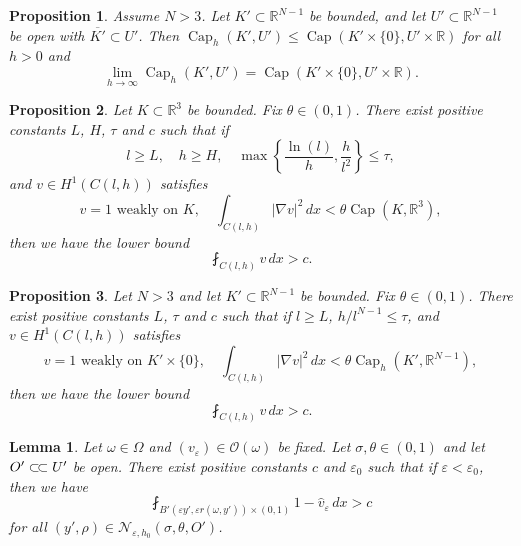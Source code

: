 \documentclass[10pt,a4paper]{amsart}
\newtheorem{proposition}{Proposition}
\newtheorem{lemma}{Lemma}
\newcommand{\cpct}{\operatorname{Cap}}
\newcommand{\csubset}{\subset\joinrel\subset}
\begin{document}
\begin{proposition} \label{pr:limit_at_infinity}
    Assume $N > 3$. Let $K' \subset \mathbb{R}^{N - 1}$ be bounded, and let $U' \subset \mathbb{R}^{N - 1}$ be open with $\overline{K'} \subset U'$. Then $\cpct_h(K', U') \le \cpct(K' \times \{0\}, U' \times \mathbb{R})$ for all $h > 0$ and
    \[
    \lim_{h \to \infty} \cpct_h(K', U') = \cpct(K' \times \{0\}, U' \times \mathbb{R}).
    \]
\end{proposition}

\begin{proposition} \label{pr:subcapacitary_growth_1}
    Let $K \subset \mathbb{R}^3$ be bounded. Fix $\theta \in (0, 1)$. There exist positive constants $L$, $H$, $\tau$ and $c$ such that if
    \[
    l \ge L, \quad h \ge H, \quad \max \left\{\frac{\ln(l)}{h}, \frac{h}{l^2} \right\} \le \tau,
    \]
    and $v \in H^1(C(l, h))$ satisfies
    \[
    v = 1 \text{ weakly on } K, \quad \int_{C(l, h)} |\nabla v|^2 \, dx < \theta \cpct(K, \mathbb{R}^3),
    \]
    then we have the lower bound
    \[
    \fint_{C(l, h)} v \, dx > c.
    \]
\end{proposition}

\begin{proposition} \label{pr:subcapacitary_growth_2}
    Let $N > 3$ and let $K' \subset \mathbb{R}^{N - 1}$ be bounded. Fix $\theta \in (0, 1)$. There exist positive constants $L$, $\tau$ and $c$ such that if $l \ge L$, $h/l^{N - 1} \le \tau$, and $v \in H^1(C(l, h))$ satisfies
    \[
    v = 1 \text{ weakly on } K' \times \{0\}, \quad \int_{C(l, h)} |\nabla v|^2 \, dx < \theta \cpct_h(K', \mathbb{R}^{N - 1}),
    \]
    then we have the lower bound
    \[
    \fint_{C(l, h)} v \, dx > c.
    \]
\end{proposition}

\begin{lemma} \label{lm:bad_point_big_average}
    Let $\omega \in \Omega$ and $(v_\varepsilon) \in \mathcal{O}(\omega)$ be fixed. Let $\sigma, \theta \in (0, 1)$ and let $O' \csubset U'$ be open. There exist positive constants $c$ and $\varepsilon_0$ such that if $\varepsilon < \varepsilon_0$, then we have
    \begin{equation} \label{eq:bad_point_big_average}
        \fint_{B'(\varepsilon y', \varepsilon r(\omega, y')) \times (0, 1)} 1 - \hat{v}_\varepsilon \, dx > c
    \end{equation}
    for all $(y', \rho) \in \mathcal{N}_{\varepsilon, h_0}(\sigma, \theta, O')$.
\end{lemma}
\end{document}
